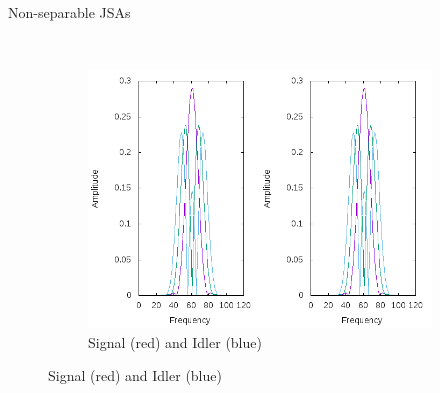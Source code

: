 \documentclass{beamer}
\begin{document}
\begin{frame}{Non-separable JSAs} 
    \begin{figure}
        \centering
        \begin{subfigure}{0.45\textwidth}
        \end{subfigure}
        ~
        \begin{subfigure}{0.45\textwidth}
        \includegraphics[width=1\textwidth]{single_sig_idler1_sinc.png}
        \caption{Signal (red) and Idler (blue)}
        \end{subfigure}
    \end{figure}

\end{frame} 
\end{document}
